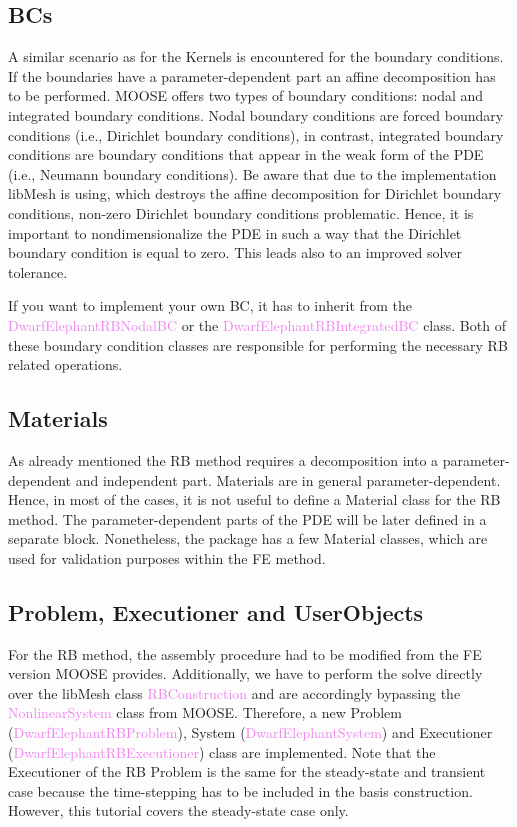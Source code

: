 \documentclass[11pt, a4paper, DIV=14]{scrartcl}
\begin{document}
\subsection{BCs}
A similar scenario as for the Kernels is encountered for the boundary conditions. If the boundaries have a parameter-dependent part an affine decomposition has to be performed. MOOSE offers two types of boundary conditions: nodal and integrated boundary conditions. Nodal boundary conditions are forced boundary conditions (i.e., Dirichlet boundary conditions), in contrast, integrated boundary conditions are boundary conditions that appear in the weak form of the PDE (i.e., Neumann boundary conditions). Be aware that due to the implementation libMesh is using, which destroys the affine decomposition for Dirichlet boundary conditions, non-zero Dirichlet boundary conditions problematic. Hence, it is important to nondimensionalize the PDE in such a way that the Dirichlet boundary condition is equal to zero. This leads also to an improved solver tolerance.

If you want to implement your own BC, it has to inherit from the \textcolor{violet}{DwarfElephantRBNodalBC} or the \textcolor{violet}{DwarfElephantRBIntegratedBC} class. Both of these boundary condition classes are responsible for performing the necessary RB related operations.

\subsection{Materials}
As already mentioned the RB method requires a decomposition into a parameter-dependent and independent part. Materials are in general parameter-dependent. Hence, in most of the cases, it is not useful to define a Material class for the RB method. The parameter-dependent parts of the PDE will be later defined in a separate block. Nonetheless, the package has a few Material classes, which are used for validation purposes within the FE method.

\subsection{Problem, Executioner and UserObjects}
For the RB method, the assembly procedure had to be modified from the FE version MOOSE provides. Additionally, we have to perform the solve directly over the libMesh class \textcolor{violet}{RBConstruction} and are accordingly bypassing the \textcolor{violet}{NonlinearSystem} class from MOOSE. Therefore, a new Problem (\textcolor{violet}{DwarfElephantRBProblem}), System (\textcolor{violet}{DwarfElephantSystem}) and Executioner (\textcolor{violet}{DwarfElephantRB\-Executioner}) class are implemented. Note that the Executioner of the RB Problem is the same for the steady-state and transient case because the time-stepping has to be included in the basis construction. However, this tutorial covers the steady-state case only.
\end{document}
